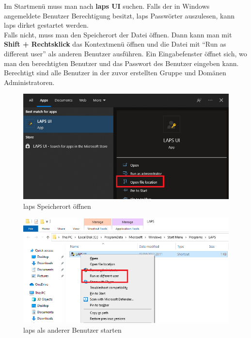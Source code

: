 Im Startmenü muss man nach \textbf{\acrshort{laps} UI} suchen. Falls der in Windows angemeldete Benutzer Berechtigung besitzt, \acrshort{laps} Passwörter auszulesen, kann \acrshort{laps} dirket gestartet werden.\\
Falls nicht, muss man den Speicherort der Datei öffnen.
Dann kann man mit \textbf{Shift + Rechtsklick} das Kontextmenü öffnen und die Datei mit ``Run as different user'' als anderen Benutzer ausführen.
Ein Eingabefenster öffnet sich, wo man den berechtigten Benutzer und das Passwort des Benutzer eingeben kann.
Berechtigt sind alle Benutzer in der zuvor erstellten Gruppe und Domänen Administratoren.\\
\begin{minipage}{0.5\linewidth}
    \begin{figure}[H]
        \centering
        \includegraphics[width=\linewidth]{../img/LAPS/usage-1.png}
        \caption{\acrshort{laps} Speicherort öffnen}
    \end{figure}
\end{minipage}
\begin{minipage}{0.5\linewidth}
    \begin{figure}[H]
        \centering
        \includegraphics[width=\linewidth]{../img/LAPS/usage-2.png}
        \caption{\acrshort{laps} als anderer Benutzer starten}
    \end{figure}
\end{minipage}\\

